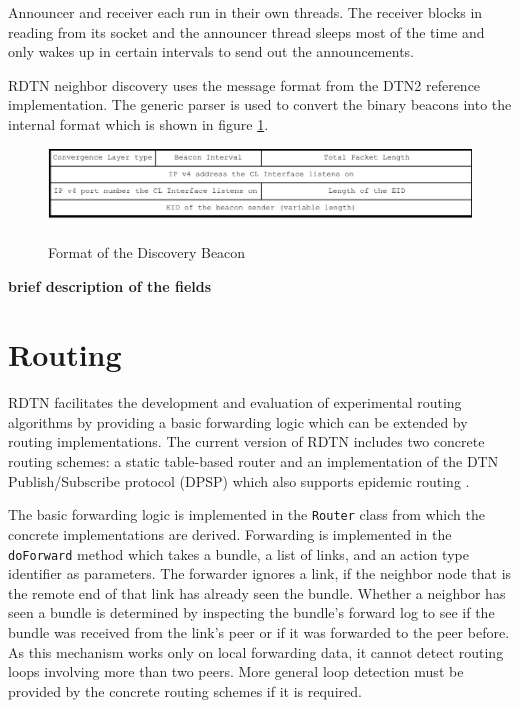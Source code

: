 \documentclass[a4paper]{article}
\begin{document}
Announcer and receiver each run in their own threads. The receiver blocks in
reading from its socket and the announcer thread sleeps most of the time and
only wakes up in certain intervals to send out the announcements.

RDTN neighbor discovery uses the message format from the DTN2 reference
implementation. The generic parser is used to convert the binary beacons into
the internal format which is shown in figure \ref{fig.discovery-format}.

\begin{figure}[h]
\begin{center}
\includegraphics[width=0.9\columnwidth]{discovery-format.pdf}\\
\caption{\label{fig.discovery-format} Format of the Discovery Beacon}
\end{center}
\end{figure}

{\bf brief description of the fields}

\section{Routing}\label{sec.routing}

RDTN facilitates the development and evaluation of experimental routing
algorithms by providing a basic forwarding logic which can be extended by
routing implementations. The current version of RDTN includes two concrete
routing schemes: a static table-based router and an implementation of the DTN
Publish/Subscribe protocol (DPSP) \cite{dtn-pubsub} which also supports epidemic
routing \cite{epidemic}.

The basic forwarding logic is implemented in the {\tt Router} class from which
the concrete implementations are derived. Forwarding is implemented in the {\tt
doForward} method which takes a bundle, a list of links, and an action type
identifier as parameters. The forwarder ignores a link, if the neighbor node
that is the remote end of that link has already seen the bundle. Whether a
neighbor has seen a bundle is determined by inspecting the bundle's forward log
to see if the bundle was received from the link's peer or if it was forwarded
to the peer before. As this mechanism works only on local forwarding data, it
cannot detect routing loops involving more than two peers.  More general loop
detection must be provided by the concrete routing schemes if it is required.
\end{document}
